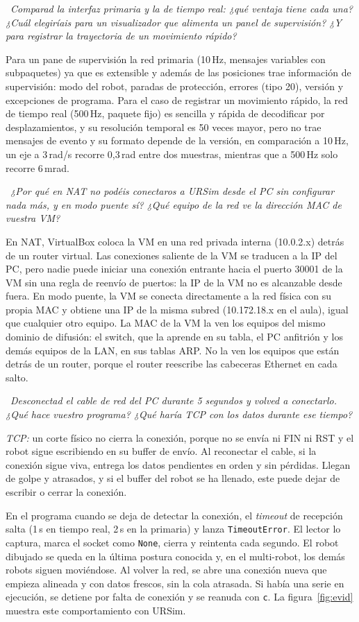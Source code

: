 \documentclass[10pt,a4paper]{article}
\newcommand{\code}[1]{\texttt{\small #1}}
\newcommand{\preg}[2]{\par\smallskip\noindent{\color{azul}\bfseries P#1.}~{\itshape #2}\par\nopagebreak}
\begin{document}
\preg{4}{Comparad la interfaz primaria y la de tiempo real: ¿qué ventaja tiene cada una? ¿Cuál
elegiríais para un visualizador que alimenta un panel de supervisión? ¿Y para registrar
la trayectoria de un movimiento rápido?}
Para un pane de supervisión la red primaria (10\,Hz, mensajes variables con subpaquetes) ya que es extensible y además de las posiciones trae información de supervisión: modo del robot, paradas de protección, errores (tipo 20), versión y excepciones de programa. Para el caso de registrar un movimiento rápido, la red de tiempo real (500\,Hz, paquete fijo) es sencilla y rápida de decodificar por desplazamientos, y su resolución temporal es 50 veces mayor, pero no trae mensajes de evento y su formato depende de la versión, en comparación a 10\,Hz, un eje a 3\,rad/s recorre 0,3\,rad entre dos muestras, mientras que a 500\,Hz solo recorre 6\,mrad.

\preg{5}{¿Por qué en NAT no podéis conectaros a URSim desde el PC sin configurar nada más, y
en modo puente sí? ¿Qué equipo de la red ve la dirección MAC de vuestra VM?}
En NAT, VirtualBox coloca la VM en una red privada interna (10.0.2.x) detrás de un router virtual. Las conexiones saliente de la VM se traducen a la IP del PC, pero nadie puede iniciar una conexión entrante hacia el puerto 30001 de la VM sin una regla de reenvío de puertos: la IP de la VM no es alcanzable desde fuera. En modo puente, la VM se conecta directamente a la red física con su propia MAC y obtiene una IP de la misma subred (10.172.18.x en el aula), igual que cualquier otro equipo. La MAC de la VM la ven los equipos del mismo dominio de difusión: el switch, que la aprende en su tabla, el PC anfitrión y los demás equipos de la LAN, en sus tablas ARP. No la ven los equipos que están detrás de un router, porque el router reescribe las cabeceras Ethernet en cada salto.

\preg{6}{Desconectad el cable de red del PC durante 5 segundos y volved a conectarlo. ¿Qué
hace vuestro programa? ¿Qué haría TCP con los datos durante ese tiempo?}
\emph{TCP:} un corte físico no cierra la conexión, porque no se envía ni FIN ni RST y el robot sigue escribiendo en su buffer de envío. Al reconectar el cable, si la conexión sigue viva, entrega los datos pendientes en orden y sin pérdidas. Llegan de golpe y atrasados, y si el buffer del robot se ha llenado, este puede dejar de escribir o cerrar la conexión. 

En el programa cuando se deja de detectar la conexión, el \emph{timeout} de recepción salta (1\,s en tiempo real, 2\,s en la primaria) y lanza \code{TimeoutError}. El lector lo captura, marca el socket como \code{None}, cierra y reintenta cada segundo. El robot dibujado se queda en la última postura conocida y, en el multi-robot, los demás robots siguen moviéndose. Al volver la red, se abre una conexión nueva que empieza alineada y con datos frescos, sin la cola atrasada. Si había una serie en ejecución, se detiene por falta de conexión y se reanuda con \code{c}. La figura~\ref{fig:evid} muestra este comportamiento con URSim.
\end{document}
